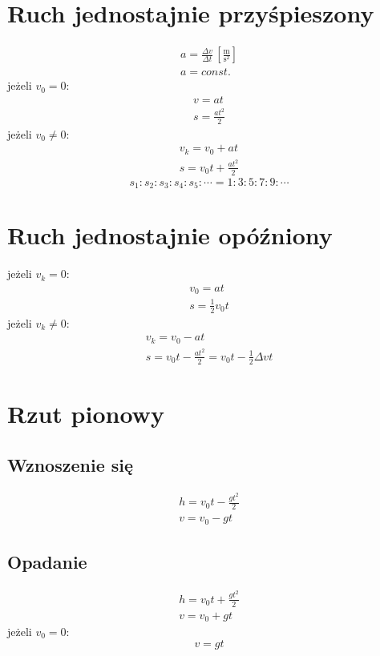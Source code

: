\documentclass{report}
\numberwithin{equation}{chapter}
\newcommand{\unit}[1]{\,\left[\mathrm{#1}\right]}
\begin{document}
    \section{Ruch jednostajnie przyśpieszony}
      \begin{gather}
        a = \frac{\Delta v}{\Delta t} \unit{\frac{m}{s^2}}\\
        a = const.
      \end{gather}
      jeżeli $v_0 = 0$:
      \begin{gather}
        v = at\\
        s = \frac{at^2}{2}
      \end{gather}
      jeżeli $v_0 \ne 0$:
      \begin{gather}
        v_k = v_0 + at\\
        s = v_0t + \frac{at^2}{2}
      \end{gather}
      \begin{equation}
        s_1:s_2:s_3:s_4:s_5:\cdots = 1:3:5:7:9:\cdots
      \end{equation}
    \section{Ruch jednostajnie opóźniony}
      jeżeli $v_k = 0$:
      \begin{gather}
        v_0 = at\\
        s = \frac{1}{2}v_0t
      \end{gather}
      jeżeli $v_k \ne 0$:
      \begin{gather}
        v_k = v_0 - at\\
        s = v_0t - \frac{at^2}{2} = v_0t - \frac{1}{2}\Delta vt
      \end{gather}
    \section{Rzut pionowy}
      \subsection{Wznoszenie się}
        \begin{gather}
          h = v_0t - \frac{gt^2}{2}\\
          v = v_0 - gt
        \end{gather}
      \subsection{Opadanie}
        \begin{gather}
          h = v_0t + \frac{gt^2}{2}\\
          v = v_0 + gt
        \end{gather}
        jeżeli $v_0 = 0$:
        \begin{equation}
          v = gt
        \end{equation}
\end{document}
